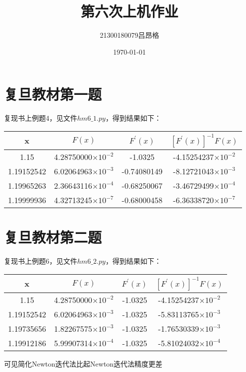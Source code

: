 \documentclass[utf8,a4paper,11pt]{article}
\title{第六次上机作业}
\author{21300180079吕昂格}
\date{\today}
\begin{document}
\maketitle
\section*{复旦教材第一题}
复现书上例题4，见文件\(hm 6\_ 1.py\)，得到结果如下：
\begin{table}[!ht]
    \begin{tabular*}{\hsize}{@{}@{\extracolsep{\fill}}cccc@{}}
    \toprule
    x &\(F(x)\) & \(F^{'}(x)\) & \([F^{'}(x)]^{-1}F(x)\)\\
    \midrule
    1.15      &4.28750000\(\times 10^{-2}\)& -1.0325&    -4.15254237\(\times 10^{-2}\) \\
    1.19152542& 6.02064963\(\times 10^{-3}\)& -0.74080149& -8.12721043\(\times 10^{-3}\)\\
    1.19965263& 2.36643116\(\times 10^{-4}\)&-0.68250067& -3.46729499\(\times 10^{-4}\)\\
    1.19999936&4.32713245\(\times 10^{-7}\)& -0.68000458 &-6.36338720\(\times 10^{-7}\)\\
    \bottomrule
    \end{tabular*}
\end{table}

\section*{复旦教材第二题}
复现书上例题6，见文件\(hm  6\_ 2.py\)，得到结果如下：

\begin{table}[!ht]
    \begin{tabular*}{\hsize}{@{}@{\extracolsep{\fill}}cccc@{}}
    \toprule
    x &\(F(x)\) & \(F^{'}(x)\) & \([F^{'}(x)]^{-1}F(x)\)\\
    \midrule
    1.15      &4.28750000\(\times 10^{-2}\)& -1.0325&    -4.15254237\(\times 10^{-2}\) \\
    1.19152542& 6.02064963\(\times 10^{-3}\)& -1.0325& -5.83113765\(\times 10^{-3}\)\\
    1.19735656& 1.82267575\(\times 10^{-3}\)&-1.0325&  -1.76530339\(\times 10^{-3}\)\\
    1.19912186&5.99907314\(\times 10^{-4}\)& -1.0325 &-5.81024032\(\times 10^{-4}\)\\
    \bottomrule
    \end{tabular*}
\end{table}
可见简化Newton迭代法比起Newton迭代法精度更差
\end{document}
